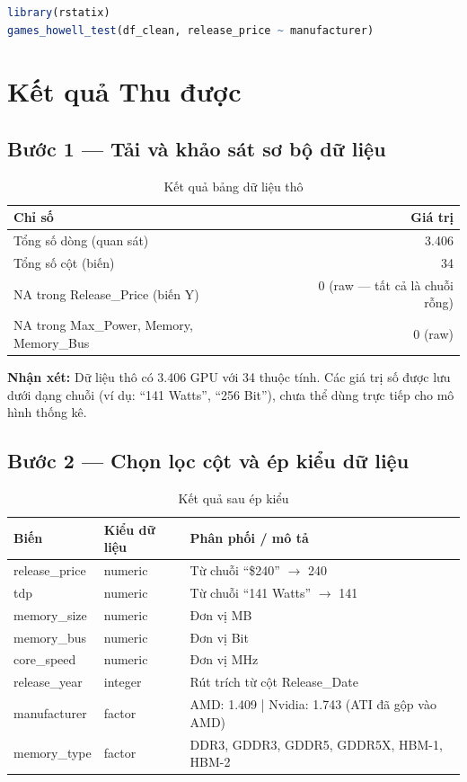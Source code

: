 \documentclass[a4paper]{article}
\begin{document}
\begin{lstlisting}[language=R, caption={Bước 7.2.4 --- Games-Howell Post hoc}]
library(rstatix)
games_howell_test(df_clean, release_price ~ manufacturer)
\end{lstlisting}

\section{Kết quả Thu được}

\subsection{Bước 1 --- Tải và khảo sát sơ bộ dữ liệu}

\begin{table}[h!]
\centering
\caption{Kết quả bảng dữ liệu thô}
\begin{tabular}{|l|r|}
\hline
\textbf{Chỉ số} & \textbf{Giá trị} \\
\hline
Tổng số dòng (quan sát) & 3.406 \\
Tổng số cột (biến) & 34 \\
NA trong Release\_Price (biến Y) & 0 (raw --- tất cả là chuỗi rỗng) \\
NA trong Max\_Power, Memory, Memory\_Bus & 0 (raw) \\
\hline
\end{tabular}
\end{table}

\textbf{Nhận xét:} Dữ liệu thô có 3.406 GPU với 34 thuộc tính. Các giá trị số được lưu dưới dạng chuỗi (ví dụ: ``141 Watts'', ``256 Bit''), chưa thể dùng trực tiếp cho mô hình thống kê.

\subsection{Bước 2 --- Chọn lọc cột và ép kiểu dữ liệu}

\begin{table}[h!]
\centering
\caption{Kết quả sau ép kiểu}
\begin{tabular}{|l|l|p{6cm}|}
\hline
\textbf{Biến} & \textbf{Kiểu dữ liệu} & \textbf{Phân phối / mô tả} \\
\hline
release\_price & numeric & Từ chuỗi ``\$240'' $\to$ 240 \\
tdp & numeric & Từ chuỗi ``141 Watts'' $\to$ 141 \\
memory\_size & numeric & Đơn vị MB \\
memory\_bus & numeric & Đơn vị Bit \\
core\_speed & numeric & Đơn vị MHz \\
release\_year & integer & Rút trích từ cột Release\_Date \\
manufacturer & factor & AMD: 1.409 | Nvidia: 1.743 (ATI đã gộp vào AMD) \\
memory\_type & factor & DDR3, GDDR3, GDDR5, GDDR5X, HBM-1, HBM-2 \\
\hline
\end{tabular}
\end{table}
\end{document}
